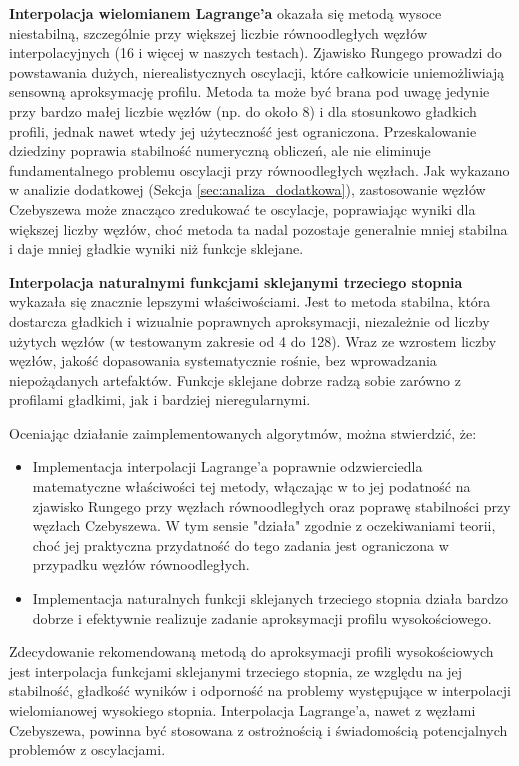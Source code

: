 \documentclass[11pt,a4paper]{article}
\begin{document}
\textbf{Interpolacja wielomianem Lagrange'a} okazała się metodą wysoce niestabilną, szczególnie przy większej liczbie równoodległych węzłów interpolacyjnych (16 i więcej w naszych testach). Zjawisko Rungego prowadzi do powstawania dużych, nierealistycznych oscylacji, które całkowicie uniemożliwiają sensowną aproksymację profilu. Metoda ta może być brana pod uwagę jedynie przy bardzo małej liczbie węzłów (np. do około 8) i dla stosunkowo gładkich profili, jednak nawet wtedy jej użyteczność jest ograniczona. Przeskalowanie dziedziny poprawia stabilność numeryczną obliczeń, ale nie eliminuje fundamentalnego problemu oscylacji przy równoodległych węzłach. Jak wykazano w analizie dodatkowej (Sekcja \ref{sec:analiza_dodatkowa}), zastosowanie węzłów Czebyszewa może znacząco zredukować te oscylacje, poprawiając wyniki dla większej liczby węzłów, choć metoda ta nadal pozostaje generalnie mniej stabilna i daje mniej gładkie wyniki niż funkcje sklejane.

\textbf{Interpolacja naturalnymi funkcjami sklejanymi trzeciego stopnia} wykazała się znacznie lepszymi właściwościami. Jest to metoda stabilna, która dostarcza gładkich i wizualnie poprawnych aproksymacji, niezależnie od liczby użytych węzłów (w testowanym zakresie od 4 do 128). Wraz ze wzrostem liczby węzłów, jakość dopasowania systematycznie rośnie, bez wprowadzania niepożądanych artefaktów. Funkcje sklejane dobrze radzą sobie zarówno z profilami gładkimi, jak i bardziej nieregularnymi.

Oceniając działanie zaimplementowanych algorytmów, można stwierdzić, że:
\begin{itemize}
    \item Implementacja interpolacji Lagrange'a poprawnie odzwierciedla matematyczne właściwości tej metody, włączając w to jej podatność na zjawisko Rungego przy węzłach równoodległych oraz poprawę stabilności przy węzłach Czebyszewa. W tym sensie "działa" zgodnie z oczekiwaniami teorii, choć jej praktyczna przydatność do tego zadania jest ograniczona w przypadku węzłów równoodległych.
    \item Implementacja naturalnych funkcji sklejanych trzeciego stopnia działa bardzo dobrze i efektywnie realizuje zadanie aproksymacji profilu wysokościowego.
\end{itemize}

Zdecydowanie rekomendowaną metodą do aproksymacji profili wysokościowych jest interpolacja funkcjami sklejanymi trzeciego stopnia, ze względu na jej stabilność, gładkość wyników i odporność na problemy występujące w interpolacji wielomianowej wysokiego stopnia. Interpolacja Lagrange'a, nawet z węzłami Czebyszewa, powinna być stosowana z ostrożnością i świadomością potencjalnych problemów z oscylacjami.
\end{document}
